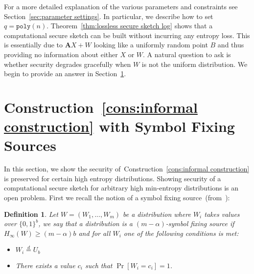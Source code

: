 \documentclass[11pt]{article}
\newcommand{\secref}[1]{\mbox{Section~\ref{#1}}}
\newcommand{\thref}[1]{\mbox{Theorem~\ref{#1}}}
\newcommand{\consref}[1]{\mbox{Construction~\ref{#1}}}
\newcommand{\vect}[1]{\ensuremath{\textbf{#1}}}
\newcommand{\poly}{\ensuremath{\mathtt{poly}}\xspace}
\newtheorem{definition}[theorem]{Definition}
\newcommand{\vA}{\vect{A}}
\begin{document}
For a more detailed explanation of the various parameters and constraints see \secref{sec:parameter settings}.  In particular, we describe how to set $q = \poly(n)$.  
\thref{thm:lossless secure sketch log} shows that a computational secure sketch can be built without incurring any entropy loss.  This is essentially due to $\vA X+W$ looking like a uniformly random point $B$ and thus providing no information about either $X$ or $W$.  A natural question to ask is whether security degrades gracefully when $W$ is not the uniform distribution.  We begin to provide an answer in \secref{sec:LWE block fixing sources}.  

\section{\consref{cons:informal construction} with Symbol Fixing Sources}
\label{sec:LWE block fixing sources}
In this section, we show the security of~\consref{cons:informal construction} is preserved for certain high entropy distributions.  Showing security of a computational secure sketch for arbitrary high min-entropy distributions is an open problem.  First we recall the notion of a symbol fixing source~(from~\cite{KZ07}): 
\begin{definition}
Let $W = (W_1,..., W_m)$ be a distribution where $W_i$ takes values over $\{0,1\}^b$, we say that a distribution is a $(m-\alpha)$-\emph{symbol fixing source} if $H_\infty(W)\geq (m - \alpha)b$ and for all $W_i$ one of the following conditions is met:
\begin{itemize}
\item $W_i \overset{d}= U_b$
\item There exists a value $c_i$ such that $\Pr[W_i = c_i] =1$.
\end{itemize}
\end{definition}
\end{document}
